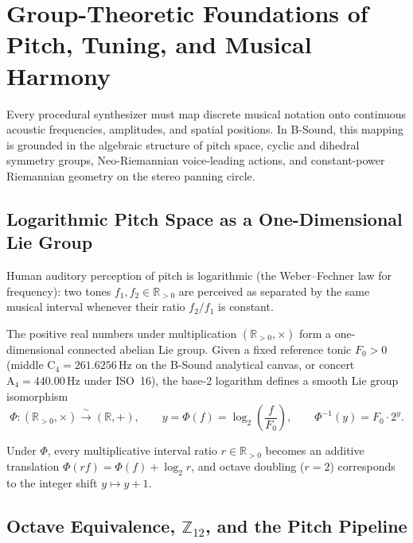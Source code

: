 \chapter{Group-Theoretic Foundations of Pitch, Tuning, and Musical Harmony}
\label{ch:group-theory}

Every procedural synthesizer must map discrete musical notation onto continuous acoustic frequencies, amplitudes, and spatial positions. In B-Sound, this mapping is grounded in the algebraic structure of pitch space, cyclic and dihedral symmetry groups, Neo-Riemannian voice-leading actions, and constant-power Riemannian geometry on the stereo panning circle.

\section{Logarithmic Pitch Space as a One-Dimensional Lie Group}

Human auditory perception of pitch is logarithmic (the Weber--Fechner law for frequency): two tones $f_1, f_2 \in \mathbb{R}_{>0}$ are perceived as separated by the same musical interval whenever their ratio $f_2 / f_1$ is constant.

\begin{definition}
The positive real numbers under multiplication $(\mathbb{R}_{>0}, \times)$ form a one-dimensional connected abelian Lie group. Given a fixed reference tonic $F_0 > 0$ (middle $\mathrm{C}_4 = 261.6256\,\text{Hz}$ on the B-Sound analytical canvas, or concert $\mathrm{A}_4 = 440.00\,\text{Hz}$ under ISO~16), the base-2 logarithm defines a smooth Lie group isomorphism
\begin{equation}
\label{eq:log2-iso}
\Phi : (\mathbb{R}_{>0}, \times) \xrightarrow{\;\sim\;} (\mathbb{R}, +), \qquad
y = \Phi(f) = \log_2\!\left(\frac{f}{F_0}\right), \qquad
\Phi^{-1}(y) = F_0 \cdot 2^y.
\end{equation}
\end{definition}

Under $\Phi$, every multiplicative interval ratio $r \in \mathbb{R}_{>0}$ becomes an additive translation $\Phi(r f) = \Phi(f) + \log_2 r$, and octave doubling ($r = 2$) corresponds to the integer shift $y \mapsto y + 1$.

\section{Octave Equivalence, $\mathbb{Z}_{12}$, and the Pitch Pipeline}

